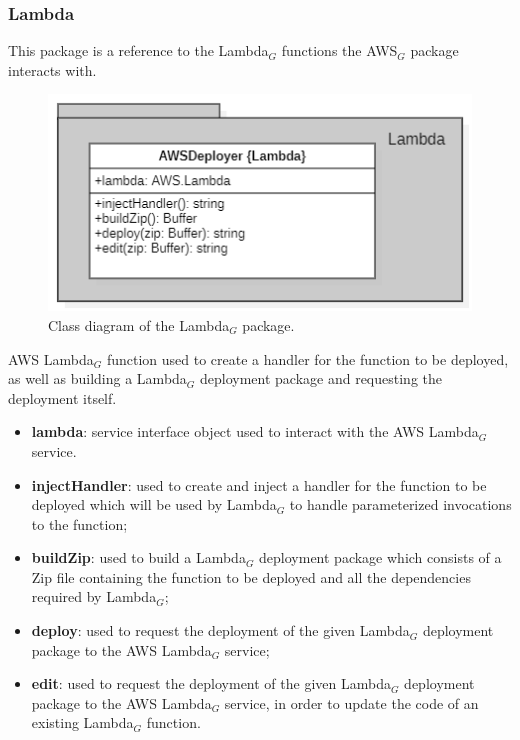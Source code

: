 	\subsubsection{Lambda}
	This package is a reference to the Lambda$_{G}$ functions the AWS$_{G}$ package interacts with.
	\begin{figure} [h!]
		\centering
		\includegraphics[width=0.7\linewidth]{diagrammi/etherless-server/Lambda}
		\caption{Class diagram of the Lambda$_{G}$ package.}
	\end{figure}
	AWS Lambda$_{G}$ function used to create a handler for the function to be deployed, as well as building a Lambda$_{G}$ deployment package and requesting the deployment itself.
	\begin{itemize}
		\item \textbf{lambda}: service interface object used to interact with the AWS Lambda$_{G}$ service.
	\end{itemize}
	\begin{itemize}
		\item \textbf{injectHandler}: used to create and inject a handler for the function to be deployed which will be used by Lambda$_{G}$ to handle parameterized invocations to the function;
		\item \textbf{buildZip}: used to build a Lambda$_{G}$ deployment package which consists of a Zip file containing the function to be deployed and all the dependencies required by Lambda$_{G}$;
		\item \textbf{deploy}: used to request the deployment of the given Lambda$_{G}$ deployment package to the AWS Lambda$_{G}$ service;
		\item \textbf{edit}: used to request the deployment of the given Lambda$_{G}$ deployment package to the AWS Lambda$_{G}$ service, in order to update the code of an existing Lambda$_{G}$ function.
	\end{itemize}
